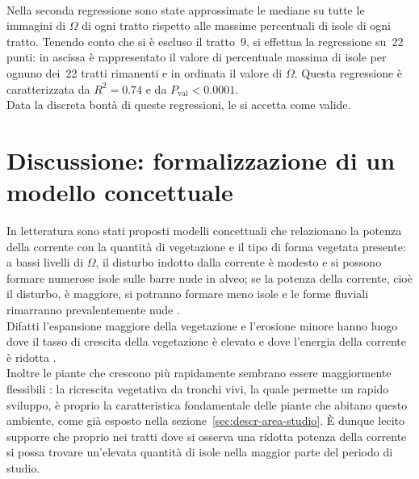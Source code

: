 \\
Nella seconda regressione sono state approssimate le mediane su tutte le immagini di $\Omega$ di ogni tratto rispetto alle massime percentuali di isole di ogni tratto. Tenendo conto che si è escluso il tratto~9, si effettua la regressione su~22 punti: in ascissa è rappresentato il valore di percentuale massima di isole per ognuno dei~22 tratti rimanenti e in ordinata il valore di $\Omega$.
Questa regressione è caratterizzata da $R^2 = 0.74$ e da $P_\mathrm{val} < 0.0001$.
\\
Data la discreta bontà di queste regressioni, le si accetta come valide.

\section{Discussione: formalizzazione di un modello concettuale}
In letteratura sono stati proposti modelli concettuali che relazionano la potenza della corrente con la quantità di vegetazione e il tipo di forma vegetata presente:
a bassi livelli di $\Omega$, il disturbo indotto dalla corrente è modesto e si possono formare numerose isole sulle barre nude in alveo;
se la potenza della corrente, cioè il disturbo, è maggiore, si potranno formare meno isole e le forme fluviali rimarranno prevalentemente nude .
\\
Difatti l'espansione maggiore della vegetazione e l'erosione minore hanno luogo dove il tasso di crescita della vegetazione è elevato e dove l'energia della corrente è ridotta .
\\
Inoltre le piante che crescono più rapidamente sembrano essere maggiormente flessibili : la ricrescita vegetativa da tronchi vivi, la quale permette un rapido sviluppo, è proprio la caratteristica fondamentale delle piante che abitano questo ambiente, come già esposto nella sezione~\ref{sec:descr-area-studio}.
È dunque lecito supporre che proprio nei tratti dove si osserva una ridotta potenza della corrente si possa trovare un'elevata quantità di isole nella maggior parte del periodo di studio.

